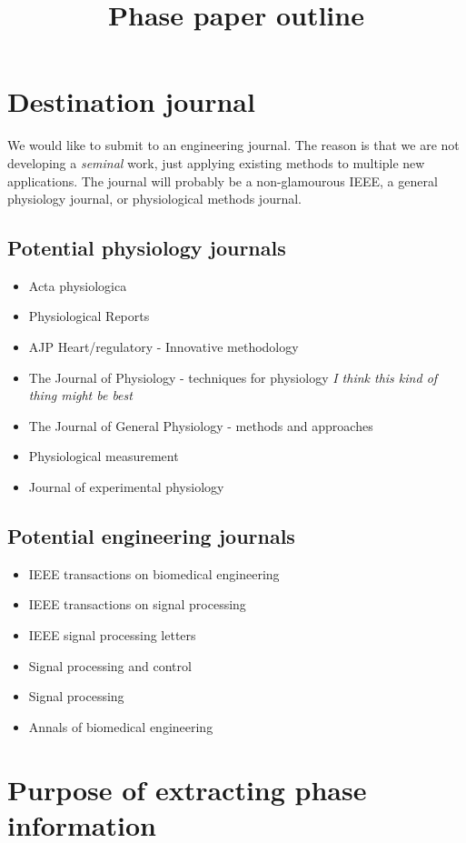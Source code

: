 \documentclass{article}
\title{Phase paper outline}
\author{}
\date{}
\begin{document}
\maketitle

\section*{Destination journal}
We would like to submit to an engineering journal. The reason is that we are not developing a \textit{seminal} work, just applying existing methods to multiple new applications. The journal will probably be a non-glamourous IEEE, a general physiology journal, or physiological methods journal. 

\subsection*{Potential physiology journals}

\begin{itemize}
\item Acta physiologica
\item Physiological Reports
\item AJP Heart/regulatory - Innovative methodology
\item The Journal of Physiology - techniques for physiology \textit{I think this kind of thing might be best}
\item The Journal of General Physiology - methods and approaches
\item Physiological measurement
\item Journal of experimental physiology
\end{itemize}

\subsection*{Potential engineering journals}
\begin{itemize}
\item IEEE transactions on biomedical engineering
\item IEEE transactions on signal processing
\item IEEE signal processing letters
\item Signal processing and control
\item Signal processing
\item Annals of biomedical engineering
\end{itemize}


\section*{Purpose of extracting phase information}
\end{document}
